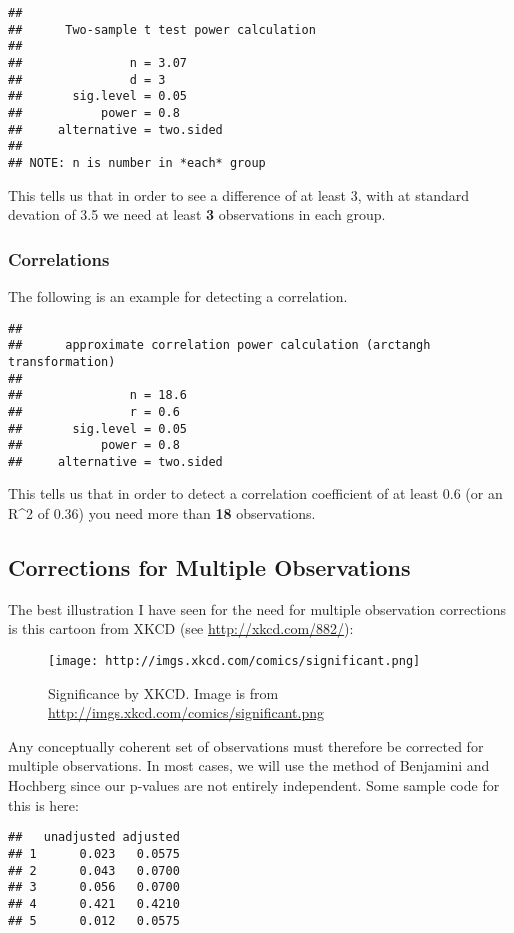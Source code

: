\documentclass[]{article}
\begin{document}
\begin{verbatim}
## 
##      Two-sample t test power calculation 
## 
##               n = 3.07
##               d = 3
##       sig.level = 0.05
##           power = 0.8
##     alternative = two.sided
## 
## NOTE: n is number in *each* group
\end{verbatim}

This tells us that in order to see a difference of at least 3, with at
standard devation of 3.5 we need at least \textbf{3} observations in
each group.

\subsubsection{Correlations}\label{correlations}

The following is an example for detecting a correlation.

\begin{verbatim}
## 
##      approximate correlation power calculation (arctangh transformation) 
## 
##               n = 18.6
##               r = 0.6
##       sig.level = 0.05
##           power = 0.8
##     alternative = two.sided
\end{verbatim}

This tells us that in order to detect a correlation coefficient of at
least 0.6 (or an R\^{}2 of 0.36) you need more than \textbf{18}
observations.

\subsection{Corrections for Multiple
Observations}\label{corrections-for-multiple-observations}

The best illustration I have seen for the need for multiple observation
corrections is this cartoon from XKCD (see \url{http://xkcd.com/882/}):

\begin{figure}[htbp]
\centering
\texttt{[image: http://imgs.xkcd.com/comics/significant.png]}
\caption{Significance by XKCD. Image is from
\url{http://imgs.xkcd.com/comics/significant.png}}
\end{figure}

Any conceptually coherent set of observations must therefore be
corrected for multiple observations. In most cases, we will use the
method of Benjamini and Hochberg since our p-values are not entirely
independent. Some sample code for this is here:

\begin{verbatim}
##   unadjusted adjusted
## 1      0.023   0.0575
## 2      0.043   0.0700
## 3      0.056   0.0700
## 4      0.421   0.4210
## 5      0.012   0.0575
\end{verbatim}
\end{document}
